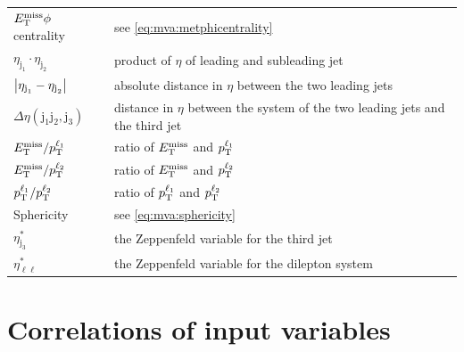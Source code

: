 \begin{table}[htpb]
\begin{tabular}{ll}
        $E_\text{T}^\text{miss} \phi$ centrality & see \cref{eq:mva:metphicentrality} \\
        $\eta_{\text{j}_1} \cdot \eta_{\text{j}_2}$ & product of $\eta$ of leading and subleading jet \\
        $\left|\eta_{\text{j}_1} -\eta_{\text{j}_2}\right|$ & absolute distance in $\eta$ between the two leading jets \\
        $\Delta \eta (\text{j}_1\text{j}_2,\text{j}_3)$ & distance in $\eta$ between the system of the two leading jets and the third jet \\
        $E_\text{T}^\text{miss} / p_\text{T}^{\ell_1}$ & ratio of $E_\text{T}^\text{miss}$ and $p_\text{T}^{\ell_1}$ \\
        $E_\text{T}^\text{miss} / p_\text{T}^{\ell_2}$ & ratio of $E_\text{T}^\text{miss}$ and $p_\text{T}^{\ell_2}$ \\
        $p_\text{T}^{\ell_1}/ p_\text{T}^{\ell_2}$ & ratio of $p_\text{T}^{\ell_1}$ and $p_\text{T}^{\ell_2}$ \\
        Sphericity & see \cref{eq:mva:sphericity} \\
        $\eta^*_{\text{j}_3}$ & the Zeppenfeld variable for the third jet~\cite{Zeppenfeld} \\
        $\eta^*_{\ell\ell}$ & the Zeppenfeld variable for the dilepton system \\

        \bottomrule
    \end{tabular}
\end{table}

\section{Correlations of input variables}\label{app:mva:correlation_inputvars}


